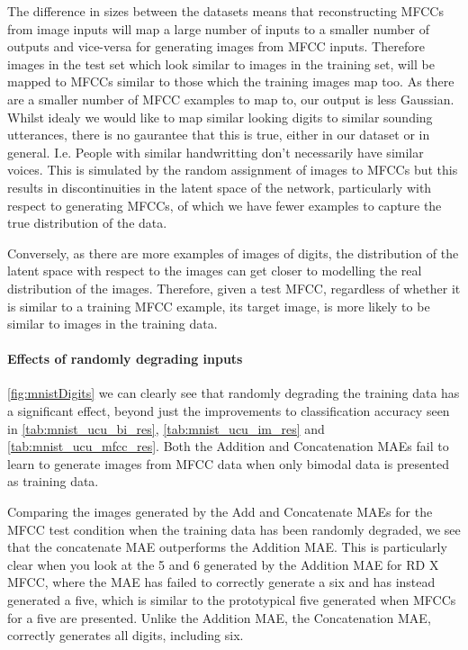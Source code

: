 The difference in sizes between the datasets means that reconstructing MFCCs from image inputs will map a large number of inputs to a smaller number of outputs and vice-versa for generating images from MFCC inputs. Therefore images in the test set which look similar to images in the training set, will be mapped to MFCCs similar to those which the training images map too. As there are a smaller number of MFCC examples to map to, our output is less Gaussian. Whilst idealy we would like to map similar looking digits to similar sounding utterances, there is no gaurantee that this is true, either in our dataset or in general. I.e. People with similar handwritting don't necessarily have similar voices. This is simulated by the random assignment of images to MFCCs but this results in discontinuities in the latent space of the network, particularly with respect to generating MFCCs, of which we have fewer examples to capture the true distribution of the data.

Conversely, as there are more examples of images of digits, the distribution of the latent space with respect to the images can get closer to modelling the real distribution of the images. Therefore, given a test MFCC, regardless of whether it is similar to a training MFCC example, its target image, is more likely to be similar to images in the training data.

\paragraph{Effects of randomly degrading inputs}
\autoref{fig:mnistDigits} we can clearly see that randomly degrading the training data has a significant effect, beyond just the improvements to classification accuracy seen in \autoref{tab:mnist_ucu_bi_res}, \autoref{tab:mnist_ucu_im_res} and \autoref{tab:mnist_ucu_mfcc_res}. Both the Addition and Concatenation MAEs fail to learn to generate images from MFCC data when only bimodal data is presented as training data.

Comparing the images generated by the Add and Concatenate MAEs for the MFCC test condition when the training data has been randomly degraded, we see that the concatenate MAE outperforms the Addition MAE. This is particularly clear when you look at the 5 and 6 generated by the Addition MAE for RD X MFCC, where the MAE has failed to correctly generate a six and has instead generated a five, which is similar to the prototypical five generated when MFCCs for a five are presented.
Unlike the Addition MAE, the Concatenation MAE, correctly generates all digits, including six.

